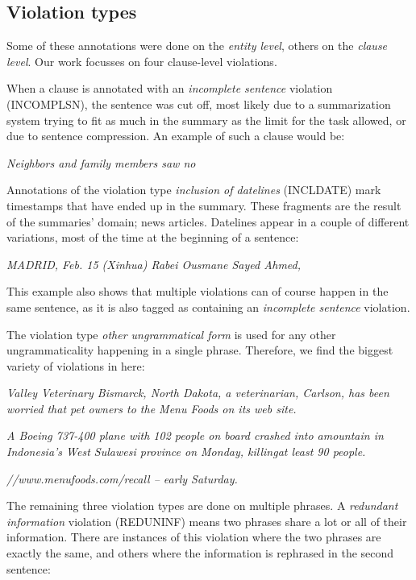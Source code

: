 \documentclass[a4paper,10pt]{scrartcl}
\theoremstyle{style}
\begin{document}
\subsection{Violation types}

Some of these annotations were done on the \textit{entity level}, others on the \textit{clause level}. Our work focusses on four clause-level violations.

When a clause is annotated with an \textit{incomplete sentence} violation (INCOMPLSN), the sentence was cut off, most likely due to a summarization system trying to fit as much in the summary as the limit for the task allowed, or due to sentence compression. An example of such a clause would be:

\quad\textit{Neighbors and family members saw no}

Annotations of the violation type \textit{inclusion of datelines} (INCLDATE) mark timestamps that have ended up in the summary. These fragments are the result of the summaries' domain; news articles. Datelines appear in a couple of different variations, most of the time at the beginning of a sentence:

\quad\textit{MADRID, Feb. 15 (Xinhua) Rabei Ousmane Sayed Ahmed,}

This example also shows that multiple violations can of course happen in the same sentence, as it is also tagged as containing an \textit{incomplete sentence} violation.

The violation type \textit{other ungrammatical form} is used for any other ungrammaticality happening in a single phrase. Therefore, we find the biggest variety of violations in here:

\quad\textit{Valley Veterinary Bismarck, North Dakota, a veterinarian, Carlson, has been worried that pet owners to the Menu Foods on its web site.}

\quad\textit{A Boeing 737-400 plane with 102 people on board crashed into amountain in Indonesia's West Sulawesi province on Monday, killingat least 90 people.}

\quad\textit{//www.menufoods.com/recall -- early Saturday.}

The remaining three violation types are done on multiple phrases. A \textit{redundant information} violation (REDUNINF) means two phrases share a lot or all of their information. There are instances of this violation where the two phrases are exactly the same, and others where the information is rephrased in the second sentence:
\end{document}
